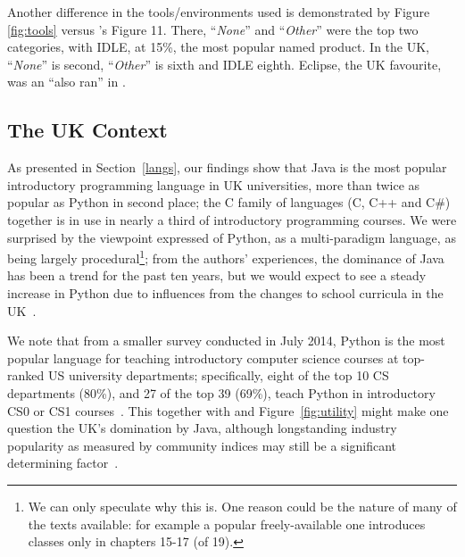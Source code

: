 \documentclass[english,submission]{programming}
\begin{document}
Another difference in the tools/environments used is demonstrated by
Figure \ref{fig:tools} versus \cite{mason+cooper:2014}'s Figure
11. There, ``{\emph{None}}'' and ``{\emph{Other}}'' were the top two
categories, with IDLE, at 15\%, the most popular named product. In the
UK, ``{\emph{None}}'' is second, ``{\emph{Other}}'' is sixth and IDLE
eighth. Eclipse, the UK favourite, was an ``also ran'' in
\cite{mason+cooper:2014}.

\subsection{The UK Context}

As presented in Section~\ref{langs}, our findings show that Java is
the most popular introductory programming language in UK universities,
more than twice as popular as Python in second place; the C family of
languages (C, C++ and C\#) together is in use in nearly a third of
introductory programming courses. We were surprised by the viewpoint
expressed of Python, as a multi-paradigm language, as being largely
procedural\footnote{We can only speculate why this is. One reason could be the nature of many of the texts available: for example a popular freely-available one \cite{Downey2012a} introduces classes only in chapters 15-17 (of 19).}; from the authors' experiences, the dominance of Java has
been a trend for the past ten years, but we would expect to see a
steady increase in Python due to influences from the changes to school
curricula in the UK~\cite{brown-et-al-toce2014}.

We note that from a smaller survey conducted in July 2014, Python is
the most popular language for teaching introductory computer science
courses at top-ranked US university departments; specifically, eight
of the top 10 CS departments (80\%), and 27 of the top 39 (69\%),
teach Python in introductory CS0 or CS1 courses~\cite{guo:2014}.  This
together with \cite{mason+cooper:2014} and Figure~\ref{fig:utility}
might make one question the UK's domination by Java, although
longstanding industry popularity as measured by community indices may
still be a significant determining factor~\cite{tiobe:nov2016}.
\end{document}
